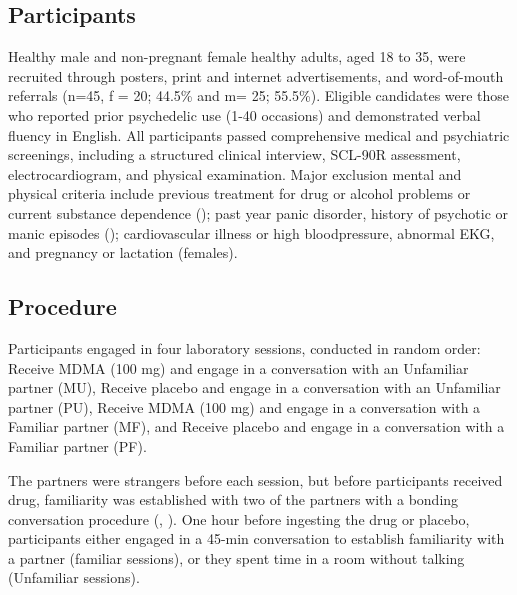 \documentclass[
  man,
  longtable,
  nolmodern,
  notxfonts,
  notimes,
  colorlinks=true,linkcolor=blue,citecolor=blue,urlcolor=blue]{apa7}
\begin{document}
\subsection{Participants}\label{participants}

Healthy male and non-pregnant female healthy adults, aged 18 to 35, were
recruited through posters, print and internet advertisements, and
word-of-mouth referrals (n=45, f = 20; 44.5\% and m= 25; 55.5\%).
Eligible candidates were those who reported prior psychedelic use (1-40
occasions) and demonstrated verbal fluency in English. All participants
passed comprehensive medical and psychiatric screenings, including a
structured clinical interview, SCL-90R assessment, electrocardiogram,
and physical examination. Major exclusion mental and physical criteria
include previous treatment for drug or alcohol problems or current
substance dependence
(); past year panic disorder, history of
psychotic or manic episodes
(); cardiovascular illness or high
bloodpressure, abnormal EKG, and pregnancy or lactation (females).

\subsection{Procedure}\label{procedure}

Participants engaged in four laboratory sessions, conducted in random
order: Receive MDMA (100 mg) and engage in a conversation with an
Unfamiliar partner (MU), Receive placebo and engage in a conversation
with an Unfamiliar partner (PU), Receive MDMA (100 mg) and engage in a
conversation with a Familiar partner (MF), and Receive placebo and
engage in a conversation with a Familiar partner (PF).

The partners were strangers before each session, but before participants
received drug, familiarity was established with two of the partners with
a bonding conversation procedure
(,
). One hour before
ingesting the drug or placebo, participants either engaged in a 45-min
conversation to establish familiarity with a partner (familiar
sessions), or they spent time in a room without talking (Unfamiliar
sessions).
\end{document}
